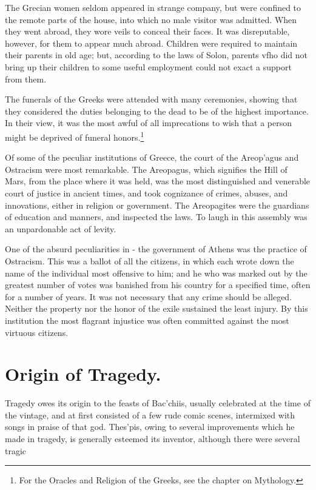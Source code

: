 \documentclass[openany,a4paper]{memoir}
\begin{document}
The Grecian women seldom appeared in strange company, 
but were confined to the remote parts of the house, into 
which no male visitor was admitted. When they went 
abroad, they wore veils to conceal their faces. It was disreputable, however, for them to appear much abroad. Children were required to maintain their parents in old age; but, 
according to the laws of Solon, parents vfho did not bring 
up their children to some useful employment could not exact a support from them. 

The funerals of the Greeks were attended with many ceremonies, showing that they considered the duties belonging 
to the dead to be of the highest importance. In their view, 
it was the most awful of all imprecations to wish that a 
person might be deprived of funeral honors.\footnote{For the Oracles and Religion of the Greeks, see the chapter on 
Mythology.} 

Of some of the peculiar institutions of Greece, the court 
of the Areop'agus and Ostracism were most remarkable. 
The Areopagus, which signifies the Hill of Mars, from the 
place where it was held, was the most distinguished and 
venerable court of justice in ancient times, and took cognizance of crimes, abuses, and innovations, either in religion 
or government. The Areopagites were the guardians of 
education and manners, and inspected the laws. To laugh 
in this assembly was an unpardonable act of levity. 

One of the absurd peculiarities in - the government of 
Athens was the practice of Ostracism. This was a ballot 
of all the citizens, in which each wrote down the name of 
the individual most offensive to him; and he who was 
marked out by the greatest number of votes was banished 
from his country for a specified time, often for a number of 
years. It was not necessary that any crime should be alleged. Neither the property nor the honor of the exile sustained the least injury. By this institution the most flagrant 
injustice was often committed against the most virtuous 
citizens. 

\section{Origin of Tragedy.}

Tragedy owes its origin to the feasts 
of Bac'chiis, usually celebrated at the time of the vintage, 
and at first consisted of a few rude comic scenes, intermixed 
with songs in praise of that god. Thes'pis, owing to several improvements which he made in tragedy, is generally 
esteemed its inventor, although there were several tragic 
\end{document}
